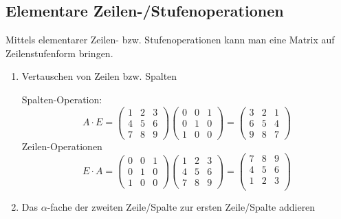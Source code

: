 \subsection{Elementare Zeilen-/Stufenoperationen}
Mittels elementarer Zeilen- bzw. Stufenoperationen kann man eine Matrix auf
Zeilenstufenform bringen.
\begin{enumerate}
    \item Vertauschen von Zeilen bzw. Spalten

        Spalten-Operation:
        \begin{equation*}
            A \cdot E =
            \begin{pmatrix}
                1 & 2 & 3\\
                4 & 5 & 6\\
                7 & 8 & 9
            \end{pmatrix}
            \begin{pmatrix}
                0 & 0 & 1\\
                0 & 1 & 0\\
                1 & 0 & 0
            \end{pmatrix}
            =
            \begin{pmatrix}
                3 & 2 & 1\\
                6 & 5 & 4\\
                9 & 8 & 7
            \end{pmatrix}
        \end{equation*}
        Zeilen-Operationen
        \begin{equation*}
            E \cdot A =
            \begin{pmatrix}
                0 & 0 & 1\\
                0 & 1 & 0\\
                1 & 0 & 0
            \end{pmatrix}
            \begin{pmatrix}
                1 & 2 & 3\\
                4 & 5 & 6\\
                7 & 8 & 9
            \end{pmatrix}
            =
            \begin{pmatrix}
                7 & 8 & 9\\
                4 & 5 & 6\\
                1 & 2 & 3\\
            \end{pmatrix}
        \end{equation*}
    \item Das $\alpha$-fache der zweiten Zeile/Spalte zur ersten Zeile/Spalte
        addieren


\end{enumerate}
